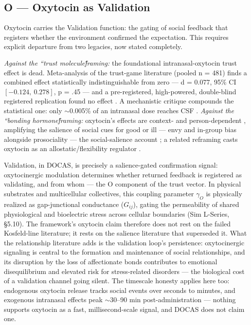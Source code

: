 \documentclass[11pt,twocolumn]{article}
\theoremstyle{plain}
\begin{document}
\subsection{O — Oxytocin as Validation}

Oxytocin carries the Validation function: the gating of social feedback that registers whether the environment confirmed the expectation. This requires explicit departure from two legacies, now stated completely.

\textit{Against the ``trust molecule\'\' framing:} the foundational intranasal-oxytocin trust effect \citep{kosfeld2005} is dead. Meta-analysis of the trust-game literature (pooled n = 481) finds a combined effect statistically indistinguishable from zero — d = 0.077, 95\% CI $[-0.124,\ 0.278]$, p = .45 \citep{nave2015} — and a pre-registered, high-powered, double-blind registered replication found no effect \citep{declerck2020}. A mechanistic critique compounds the statistical one: only $\sim$0.005\% of an intranasal dose reaches CSF \citep{leng2016}. \textit{Against the ``bonding hormone\'\' framing:} oxytocin's effects are context- and person-dependent \citep{bartz2011}, amplifying the salience of social cues for good or ill — envy and in-group bias alongside prosociality — the social-salience account \citep{shamay2016}; a related reframing casts oxytocin as an allostatic/flexibility regulator \citep{quintana2020}.

Validation, in DOCAS, is precisely a salience-gated confirmation signal: oxytocinergic modulation determines whether returned feedback is registered as validating, and from whom — the O component of the trust vector. In physical substrates and multicellular collectives, this coupling parameter $\gamma_O$ is physically realized as gap-junctional conductance ($G_{ij}$), gating the permeability of shared physiological and bioelectric stress across cellular boundaries (Sim L-Series, \S{}5.10). The framework's oxytocin claim therefore does not rest on the failed Kosfeld-line literature; it rests on the salience literature that superseded it. What the relationship literature adds is the validation loop's persistence: oxytocinergic signaling is central to the formation and maintenance of social relationships, and its disruption by the loss of affectionate bonds contributes to emotional disequilibrium and elevated risk for stress-related disorders \citep{hurlemann2016} — the biological cost of a validation channel going silent. The timescale honesty applies here too: endogenous oxytocin release tracks social events over seconds to minutes, and exogenous intranasal effects peak $\sim$30–90 min post-administration \citep{leng2016} — nothing supports oxytocin as a fast, millisecond-scale signal, and DOCAS does not claim one.
\end{document}
